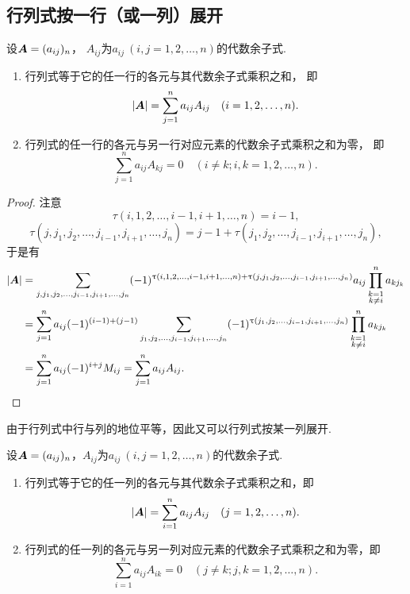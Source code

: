 \subsection{行列式按一行（或一列）展开}
\begin{theorem}\label{theorem:行列式.行列式按行展开}
设\(\boldsymbol{A}=(a_{ij})_n\)，
\(A_{ij}\)为\(a_{ij}\ (i,j=1,2,\dotsc,n)\)的代数余子式.
\begin{enumerate}
	\item 行列式等于它的任一行的各元与其代数余子式乘积之和，
	即\begin{equation}
		\abs{\boldsymbol{A}} = \sum_{j=1}^n a_{ij} A_{ij}
		\quad(i=1,2,\dotsc,n).
	\end{equation}

	\item 行列式的任一行的各元与另一行对应元素的代数余子式乘积之和为零，
	即\begin{equation}
		\sum_{j=1}^n a_{ij} A_{kj} = 0
		\quad(i \neq k;
		i,k=1,2,\dotsc,n).
	\end{equation}
\end{enumerate}
\begin{proof}
注意\[
	\tau(i,1,2,\dotsc,i-1,i+1,\dotsc,n) = i-1,
\]\[
	\tau(j,j_1,j_2,\dotsc,j_{i-1},j_{i+1},\dotsc,j_n)
	= j-1+\tau(j_1,j_2,\dotsc,j_{i-1},j_{i+1},\dotsc,j_n),
\]于是有\begin{align*}
	\abs{\boldsymbol{A}}
	&= \sum_{j,j_1,j_2,\dotsc,j_{i-1},j_{i+1},\dotsc,j_n}
		(-1)^{\uptau(i,1,2,\dotsc,i-1,i+1,\dotsc,n) + \uptau(j,j_1,j_2,\dotsc,j_{i-1},j_{i+1},\dotsc,j_n)}
		a_{ij} \prod_{\substack{k=1 \\ k \neq i}}^n a_{k j_k} \\
	&= \sum_{j=1}^n a_{ij} (-1)^{(i-1)+(j-1)}
		\sum_{j_1,j_2,\dotsc,j_{i-1},j_{i+1},\dotsc,j_n}
			(-1)^{\uptau(j_1,j_2,\dotsc,j_{i-1},j_{i+1},\dotsc,j_n)}
				\prod_{\substack{k=1 \\ k \neq i}}^n a_{k j_k} \\
	&= \sum_{j=1}^n a_{ij} (-1)^{i+j} M_{ij}
	= \sum_{j=1}^n a_{ij} A_{ij}.
	\qedhere
\end{align*}
\end{proof}
\end{theorem}

由于行列式中行与列的地位平等，因此又可以行列式按某一列展开.
\begin{theorem}
设\(\boldsymbol{A}=(a_{ij})_n\)，\(A_{ij}\)为\(a_{ij}\ (i,j=1,2,\dotsc,n)\)的代数余子式.
\begin{enumerate}
	\item 行列式等于它的任一列的各元与其代数余子式乘积之和，即\begin{equation}
		\abs{\boldsymbol{A}} = \sum_{i=1}^n a_{ij} A_{ij}
		\quad(j=1,2,\dotsc,n).
	\end{equation}

	\item 行列式的任一列的各元与另一列对应元素的代数余子式乘积之和为零，即\begin{equation}
		\sum_{i=1}^n a_{ij} A_{ik} = 0
		\quad(j \neq k;
		j,k=1,2,\dotsc,n).
	\end{equation}
\end{enumerate}
\end{theorem}

